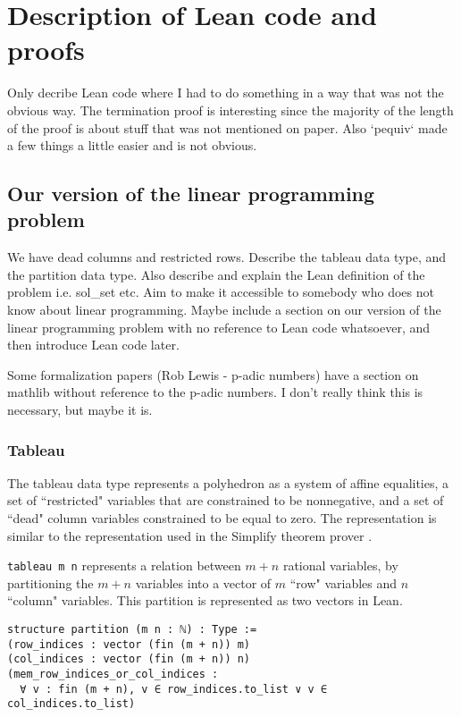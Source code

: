 \documentclass[11pt]{article} %
\begin{document}
\section{Description of Lean code and proofs}
\color{red} Only decribe Lean code where I had to do something in a way that was not the obvious way. The termination proof is interesting since the majority of the length of the proof is about stuff that was not mentioned on paper. Also `pequiv` made a few things a little easier and is not obvious. \color{black}

\subsection{Our version of the linear programming problem}
\color{red}We have dead columns and restricted rows. Describe the tableau data type, and the partition data type.
Also describe and explain the Lean definition of the problem i.e. sol\_set etc. Aim to make it accessible to somebody who does not know about linear programming. Maybe include a section on our  version of the linear programming problem with no reference to Lean code whatsoever, and then introduce Lean code later.

Some formalization papers (Rob Lewis - p-adic numbers) have a section on mathlib without reference to the p-adic numbers. I don't really think this is necessary, but maybe it is.\color{black}



\subsubsection{Tableau}
The tableau data type represents a polyhedron as a system of affine equalities, a set of ``restricted" variables that are constrained to be nonnegative, and a set of ``dead" column variables constrained to be equal to zero. The representation is similar to the representation used in the Simplify theorem prover \cite{simplify}.

\verb|tableau m n| represents a relation between $m + n$ rational variables, by partitioning the $m + n$ variables into a vector of $m$ ``row" variables and $n$ ``column" variables. This partition is represented as two vectors in Lean.
\begin{lstlisting}
structure partition (m n : ℕ) : Type :=
(row_indices : vector (fin (m + n)) m)
(col_indices : vector (fin (m + n)) n)
(mem_row_indices_or_col_indices :
  ∀ v : fin (m + n), v ∈ row_indices.to_list ∨ v ∈ col_indices.to_list)
\end{lstlisting}
\end{document}
